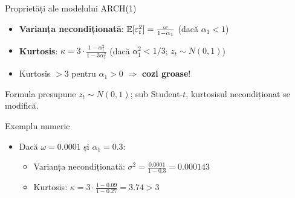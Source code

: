 \documentclass[9pt, aspectratio=169, t]{beamer}
\begin{document}
\begin{frame}{Proprietăți ale modelului ARCH(1)}
    \small
        \begin{prop}[Proprietăți ARCH(1): $\sigma_t^2 = \omega + \alpha_1 \varepsilon_{t-1}^2$]
            \begin{itemize}
                \item \textbf{Varianța necondiționată}: $\mathbb{E}[\varepsilon_t^2] = \frac{\omega}{1 - \alpha_1}$ (dacă $\alpha_1 < 1$)
                \item \textbf{Kurtosis}: $\kappa = 3 \cdot \frac{1 - \alpha_1^2}{1 - 3\alpha_1^2}$ (dacă $\alpha_1^2 < 1/3$; $z_t \sim N(0,1)$)
                \item Kurtosis $> 3$ pentru $\alpha_1 > 0$ $\Rightarrow$ \textbf{cozi groase}!
            \end{itemize}
        \end{prop}
        \begin{rmk}
            Formula presupune $z_t \sim N(0,1)$; sub Student-$t$, kurtosisul necondiționat se modifică.
        \end{rmk}
        \vspace{0.1cm}
        \begin{exampleblock}{Exemplu numeric}
            \begin{itemize}
                \item Dacă $\omega = 0.0001$ și $\alpha_1 = 0.3$:
                    \begin{itemize}
                        \item Varianța necondiționată: $\sigma^2 = \frac{0.0001}{1 - 0.3} = 0.000143$
                        \item Kurtosis: $\kappa = 3 \cdot \frac{1 - 0.09}{1 - 0.27} = 3.74 > 3$
                    \end{itemize}
            \end{itemize}
        \end{exampleblock}
\end{frame}

\end{document}
